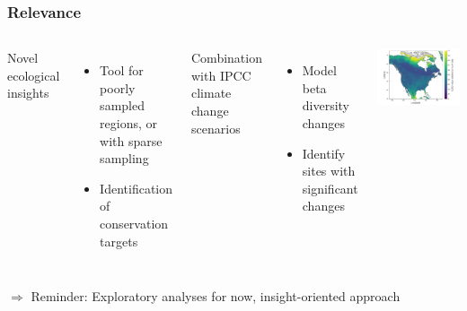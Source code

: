 \documentclass[10pt]{beamer}
\begin{document}
\begin{frame}
  \frametitle{Relevance}
  \begin{columns}
    \hspace*{-0cm}
      Novel ecological insights
      \begin{itemize}
        \item Tool for poorly sampled regions, or with sparse sampling
        \item Identification of conservation targets
      \end{itemize}
      \vspace{0.5cm}
      Combination with IPCC climate change scenarios
      \begin{itemize}
        \item Model beta diversity changes
        \item Identify sites with significant changes
      \end{itemize}
      \vspace{0.5cm}
    \hspace*{-1cm}
      \includegraphics[scale=0.10]{fig/05_sdm_lcbd.png}
  \end{columns}
  $\Rightarrow$ Reminder: Exploratory analyses for now, insight-oriented approach
\end{frame}
\end{document}
